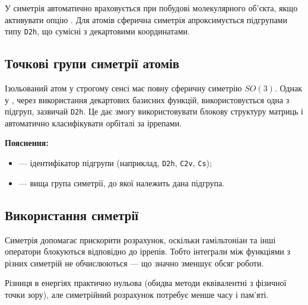 У \PySCF{} симетрія автоматично враховується при побудові молекулярного об’єкта, якщо активувати опцію . Для атомів сферична симетрія апроксимується підгрупами типу \texttt{D2h}, що сумісні з декартовими координатами.

\subsection{Точкові групи симетрії атомів}

Ізольований атом у строгому сенсі має повну сферичну симетрію \( SO(3) \).
Однак у \PySCF, через використання декартових базисних функцій, використовується одна з підгруп, зазвичай \texttt{D2h}.
Це дає змогу використовувати блокову структуру матриць і автоматично класифікувати орбіталі за іррепами.


\textbf{Пояснення:}
\begin{itemize}
	\item {} --- ідентифікатор підгрупи (наприклад, \texttt{D2h}, \texttt{C2v}, \texttt{Cs});
	\item {} --- вища група симетрії, до якої належить дана підгрупа.
\end{itemize}

\subsection{Використання симетрії}

Симетрія допомагає прискорити розрахунок, оскільки гамільтоніан та інші оператори блокуються відповідно до іррепів.
Тобто інтеграли між функціями з різних симетрій не обчислюються --- що значно зменшує обсяг роботи.


\begin{commentbox}
	Різниця в енергіях практично нульова (обидва методи еквівалентні з фізичної точки зору),
	але симетрійний розрахунок потребує менше часу і пам’яті.
\end{commentbox}

